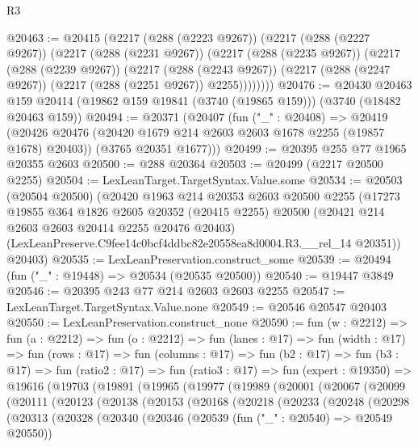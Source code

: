 \begin{lexlean}{R3}
\begin{coremodule}
@20463 := @20415
    (@2217
      (@288 (@2223 @9267))
      (@2217
        (@288 (@2227 @9267))
        (@2217
          (@288 (@2231 @9267))
          (@2217
            (@288 (@2235 @9267))
            (@2217
              (@288 (@2239 @9267))
              (@2217
                (@288 (@2243 @9267))
                (@2217 (@288 (@2247 @9267)) (@2217 (@288 (@2251 @9267)) @2255))))))))
@20476 := @20430
    @20463
    @159
    @20414
    (@19862 @159 @19841 (@3740 (@19865 @159)))
    (@3740 (@18482 @20463 @159))
@20494 := @20371
    (@20407
      (fun ("_" : @20408) =>
      @20419
        (@20426 @20476 (@20420 @1679 @214 @2603 @2603 @1678 @2255 (@19857 @1678) @20403))
        (@3765 @20351 @1677)))
@20499 := @20395 @255 @77 @1965 @20355 @2603
@20500 := @288 @20364
@20503 := @20499 (@2217 @20500 @2255)
@20504 := LexLeanTarget.TargetSyntax.Value.some
@20534 := @20503
    (@20504 @20500)
    (@20420
      @1963
      @214
      @20353
      @2603
      @20500
      @2255
      (@17273
        @19855
        @364
        @1826
        @2605
        @20352
        (@20415 @2255)
        @20500
        (@20421 @214 @2603 @2603 @20414 @2255 @20476 @20403)
        (LexLeanPreserve.C9fee14c0bcf4ddbc82e20558ea8d0004.R3.__rel_14 @20351))
      @20403)
@20535 := LexLeanPreservation.construct_some
@20539 := @20494 (fun ("_" : @19448) => @20534 (@20535 @20500))
@20540 := @19447 @3849
@20546 := @20395 @243 @77 @214 @2603 @2603 @2255
@20547 := LexLeanTarget.TargetSyntax.Value.none
@20549 := @20546 @20547 @20403
@20550 := LexLeanPreservation.construct_none
@20590 := fun (w : @2212) =>
  fun (a : @2212) =>
  fun (o : @2212) =>
  fun (lanes : @17) =>
  fun (width : @17) =>
  fun (rows : @17) =>
  fun (columns : @17) =>
  fun (b2 : @17) =>
  fun (b3 : @17) =>
  fun (ratio2 : @17) =>
  fun (ratio3 : @17) =>
  fun (expert : @19350) =>
  @19616
    (@19703
      (@19891
        (@19965
          (@19977
            (@19989
              (@20001
                (@20067
                  (@20099
                    (@20111
                      (@20123
                        (@20138
                          (@20153
                            (@20168
                              (@20218
                                (@20233
                                  (@20248
                                    (@20298
                                      (@20313
                                        (@20328
                                          (@20340
                                            (@20346
                                              (@20539 (fun ("_" : @20540) => @20549 @20550))

\end{coremodule}
\end{lexlean}
